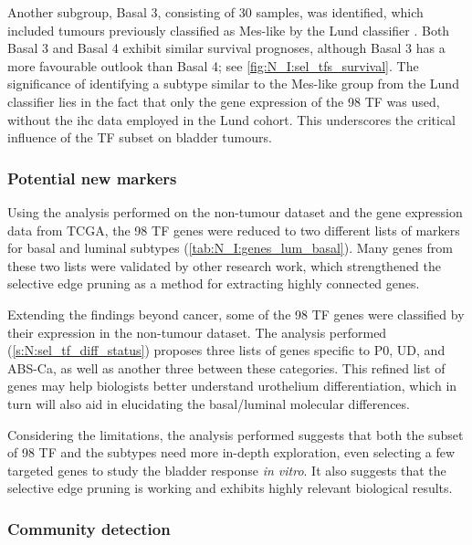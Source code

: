 Another subgroup, Basal 3, consisting of 30 samples, was identified, which included tumours previously classified as Mes-like by the Lund classifier \citep{Marzouka2018-ge}. Both Basal 3 and Basal 4 exhibit similar survival prognoses, although Basal 3 has a more favourable outlook than Basal 4; see \cref{fig:N_I:sel_tfs_survival}. The significance of identifying a subtype similar to the Mes-like group from the Lund classifier lies in the fact that only the gene expression of the 98 TF was used, without the \acrlong{ihc} data employed in the Lund cohort. This underscores the critical influence of the TF subset on bladder tumours.



\subsubsection*{Potential new markers}

Using the analysis performed on the non-tumour dataset and the gene expression data from TCGA, the 98 TF genes were reduced to two different lists of markers for basal and luminal subtypes (\cref{tab:N_I:genes_lum_basal}). Many genes from these two lists were validated by other research work, which strengthened the selective edge pruning as a method for extracting highly connected genes.

Extending the findings beyond cancer, some of the 98 TF genes were classified by their expression in the non-tumour dataset. The analysis performed (\cref{s:N:sel_tf_diff_status}) proposes three lists of genes specific to P0, UD, and ABS-Ca, as well as another three between these categories. This refined list of genes may help biologists better understand urothelium differentiation, which in turn will also aid in elucidating the basal/luminal molecular differences.

Considering the limitations, the analysis performed suggests that both the subset of 98 TF and the subtypes need more in-depth exploration, even selecting a few targeted genes to study the bladder response \textit{in vitro}. It also suggests that the selective edge pruning is working and exhibits highly relevant biological results.

\subsubsection*{Community detection}

